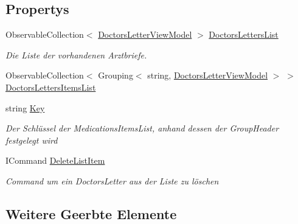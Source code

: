 \subsection*{Propertys}
\begin{DoxyCompactItemize}
\item 
Observable\+Collection$<$ \mbox{\hyperlink{classmy_m_d_1_1_view_model_1_1_overview_tab_view_model_1_1_doctors_letter_view_model}{Doctors\+Letter\+View\+Model}} $>$ \mbox{\hyperlink{classmy_m_d_1_1_view_model_1_1_overview_tab_view_model_1_1_overview_view_model_ab0450e3df5b99c435084ad74c2ea65d0}{Doctors\+Letters\+List}}
\begin{DoxyCompactList}\small\item\em Die Liste der vorhandenen Arztbriefe. \end{DoxyCompactList}\item 
Observable\+Collection$<$ Grouping$<$ string, \mbox{\hyperlink{classmy_m_d_1_1_view_model_1_1_overview_tab_view_model_1_1_doctors_letter_view_model}{Doctors\+Letter\+View\+Model}} $>$ $>$ \mbox{\hyperlink{classmy_m_d_1_1_view_model_1_1_overview_tab_view_model_1_1_overview_view_model_a01ae80c786f5f25f3305977fd9f6e380}{Doctors\+Letters\+Items\+List}}
\item 
string \mbox{\hyperlink{classmy_m_d_1_1_view_model_1_1_overview_tab_view_model_1_1_overview_view_model_a2ce7b1e7da886e5fccb312edaa49b0be}{Key}}
\begin{DoxyCompactList}\small\item\em Der Schlüssel der Medications\+Items\+List, anhand dessen der Group\+Header festgelegt wird \end{DoxyCompactList}\item 
I\+Command \mbox{\hyperlink{classmy_m_d_1_1_view_model_1_1_overview_tab_view_model_1_1_overview_view_model_aace971b1b9ab483527d1ae8eccde8399}{Delete\+List\+Item}}
\begin{DoxyCompactList}\small\item\em Command um ein Doctors\+Letter aus der Liste zu löschen \end{DoxyCompactList}\end{DoxyCompactItemize}
\subsection*{Weitere Geerbte Elemente}


